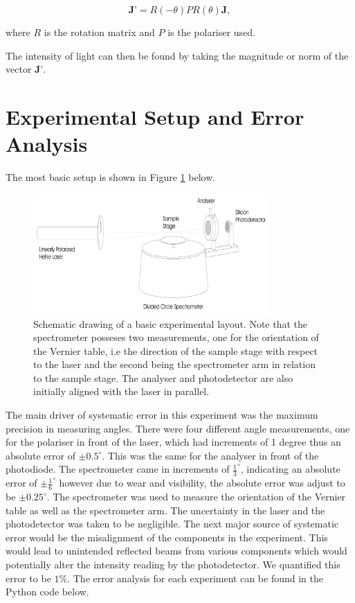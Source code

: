 \documentclass{article}
\begin{document}
\begin{equation}
    \textbf{J'} = R(-\theta)PR(\theta)\textbf{J},
\end{equation}

where $R$ is the rotation matrix and $P$ is the polariser used.

The intensity of light can then be found by taking the magnitude or norm of the vector $\textbf{J'}$.

\section{Experimental Setup and Error Analysis}
The most basic setup is shown in Figure \ref{fig:diagram} below.

\begin{figure}[H]
    \centering
    \includegraphics[width=0.8\textwidth]{experimentsetup.png}
    \caption{Schematic drawing of a basic experimental layout. Note that the spectrometer posseses 
    two measurements, one for the orientation of the Vernier table, i.e the direction of the sample
    stage with respect to the laser and the second being the spectrometer arm in relation to the 
    sample stage. The analyser and photodetector are also initially aligned with the laser in 
    parallel.}
    \label{fig:diagram}
\end{figure}

The main driver of systematic error in this experiment was the maximum precision in measuring angles. 
There were four different angle measurements, one for the polariser in front of the laser, which had 
increments of 1 degree thus an absolute error of $\pm 0.5^\circ$. This was the same for the analyser 
in front of the photodiode. The spectrometer came in increments of $\frac{1}{3}^\circ$, indicating an 
absolute error of $\pm\frac{1}{6}^\circ$ however due to wear and visibility, the absolute error was 
adjust to be $\pm0.25^\circ$. The spectrometer was used to measure the orientation of the Vernier table 
as well as the spectrometer arm. The uncertainty in the laser and the photodetector was taken to be 
negligible. The next major source of systematic error would be the misalignment of the components in 
the experiment. This would lead to unintended reflected beams from various components which would 
potentially alter the intensity reading by the photodetector. We quantified this error to be $1\%$.
The error analysis for each experiment can be found in the Python code below.
\end{document}
